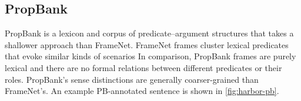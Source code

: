 \documentclass[11pt,a4paper]{article}
\newcommand{\ensuretext}[1]{#1}
\newcommand{\mkmarker}{\ensuretext{\textcolor{red}{\ensuremath{^{\textsc{M}}_{\textsc{K}}}}}}
\newcommand{\stmarker}{\ensuretext{\textcolor{orange}{\ensuremath{^{\textsc{S}}_{\textsc{T}}}}}}
\newcommand{\arkcomment}[3]{\ensuretext{\textcolor{#3}{[#1 #2]}}}
\newcommand{\mk}[1]{\arkcomment{\mkmarker}{#1}{red}}
\newcommand{\st}[1]{\arkcomment{\stmarker}{#1}{orange}}
\newcommand{\citeposs}[2][]{\citeauthor{#2}'s (\citeyear[#1]{#2})}
\newcommand{\pbf}[1]{\mbox{\textsf{#1}}} %
\newcommand{\pbr}[1]{\textbf{\textsf{#1}}} %
\newcommand{\finalversion}[1]{#1}
\begin{document}


\subsection{PropBank}\label{sec:pb}
PropBank \citep[PB;][]{palmer-05} is a lexicon and corpus of predicate--argument
structures that takes a shallower approach than FrameNet. 
FrameNet frames cluster lexical predicates that evoke similar kinds of scenarios %
In comparison, 
PropBank frames are purely lexical and there are no formal relations between different predicates 
or their roles. PropBank's sense distinctions are generally coarser-grained than FrameNet's.
An example PB-annotated sentence is shown in \cref{fig:harbor-pb}.

\end{document}
